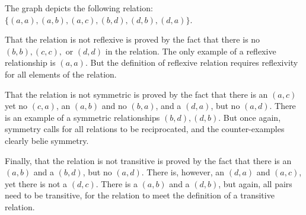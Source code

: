 The graph depicts the following relation:
$\{(a,a),(a,b),(a,c),(b,d),(d,b),(d,a)\}$.

That the relation is not reflexive is proved by the fact that there is no
$(b,b), (c,c),$ or $(d,d)$ in the relation. The only example of a reflexive
relationship is $(a,a)$. But the definition of reflexive relation requires
reflexivity for all elements of the relation.

That the relation is not symmetric is proved by the fact that there is an
$(a,c)$ yet no $(c,a)$, an $(a,b)$ and no $(b,a)$, and a $(d,a)$, but no
$(a,d)$. There is an example of a symmetric relationships $(b,d),(d,b)$. But
once again, symmetry calls for all relations to be reciprocated, and the
counter-examples clearly belie symmetry.

Finally, that the relation is not transitive is proved by the fact that there
is an $(a,b)$ and a $(b,d)$, but no $(a,d)$. There is, however, an $(d,a)$
and $(a,c)$, yet there is not a $(d,c)$. There is a $(a,b)$ and a $(d,b)$,
but again, all pairs need to be transitive, for the relation to meet the
definition of a transitive relation.
